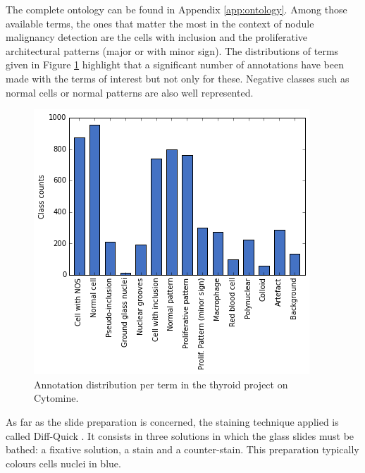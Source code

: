 The complete ontology can be found in Appendix \ref{app:ontology}. Among those available terms, the ones that matter the most in the context of nodule malignancy detection are the cells with inclusion and the proliferative architectural patterns (major or with minor sign). The distributions of terms given in Figure \ref{fig:ontology_histograms} highlight that a significant number of annotations have been made with the terms of interest but not only for these. Negative classes such as normal cells or normal patterns are also well represented. 

\begin{figure}
	\center
	\includegraphics[scale=0.65]{image/thyroid_annotations.png}
	\caption{Annotation distribution per term in the thyroid project on Cytomine.}
	\label{fig:ontology_histograms}
\end{figure}

As far as the slide preparation is concerned, the staining technique applied is called Diff-Quick \cite{diffquick2016}. It consists in three solutions in which the glass slides must be bathed: a fixative solution, a stain and a counter-stain. This preparation typically colours cells nuclei in blue. 

